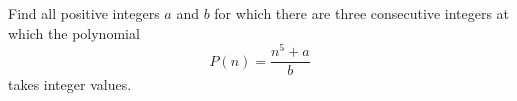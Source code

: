 Find all positive integers $a$ and $b$ for which there are three consecutive integers at which the polynomial \[P\left(n\right)=\frac{n^5+a}{b}\] takes integer values.